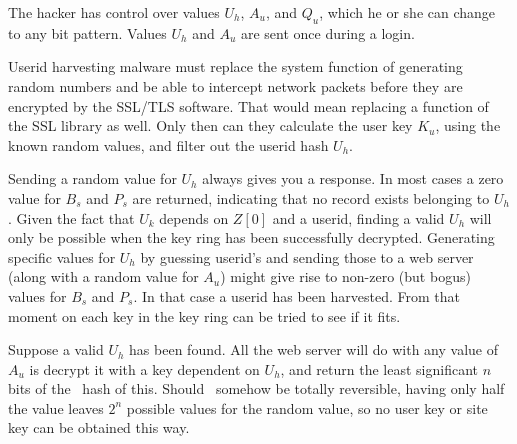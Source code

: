 \label{sec:manipulating_values}
The hacker has control over values $U_h$, $A_u$, and $Q_u$, which he or she can change to any bit pattern.
Values $U_h$ and $A_u$ are sent once during a login.
\par
Userid harvesting malware must replace the system function of generating random numbers
and be able to intercept network packets before they are encrypted by the SSL/TLS software.
That would mean replacing a function of the SSL library as well.
Only then can they calculate the user key $K_u$,
using the known random values,
and filter out the userid hash $U_h$.
\par
Sending a random value for $U_h$ always gives you a response.
In most cases a zero value for $B_s$ and $P_s$ are returned,
indicating that no record exists belonging to $U_h$.
Given the fact that $U_k$ depends on $Z[0]$ and a userid,
finding a valid $U_h$ will only be possible when the key ring
has been successfully decrypted.
Generating specific values for $U_h$ by guessing userid's and sending those to a web server
(along with a random value for $A_u$)
might give rise to non-zero
(but bogus)
values for $B_s$ and $P_s$.
In that case a userid has been harvested.
From that moment on each key in the key ring can be tried to see if it fits.
\par
Suppose a valid $U_h$ has been found.
All the web server will do with any value of $A_u$ is decrypt it with a key dependent on $U_h$,
and return the least significant $n$ bits of the \SHA\ hash of this.
Should \SHA\ somehow be totally reversible,
having only half the value leaves $2^n$ possible values for the random value,
so no user key or site key can be obtained this way.
